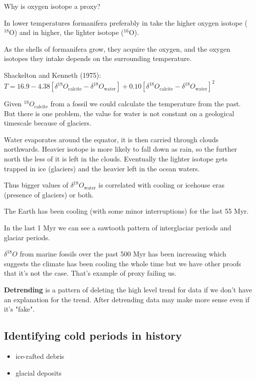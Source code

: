 Why is oxygen isotope a proxy?

In lower temperatures formanifera preferably in take the higher oxygen
isotope (${}^{18}$O) and in higher, the lighter isotope (${}^{16}$O).

As the shells of formanifera grow, they acquire the oxygen, and the oxygen
isotopes they intake depends on the surrounding temperature.

Shackelton and Kenneth (1975):
$T = 16.9 - 4.38[
\delta^{18}O_{\text{calcite}} - \delta^{18}O_{\text{water}}
]
+
0.10[
\delta^{18}O_{\text{calcite}} - \delta^{18}O_{\text{water}}
]^2
$

Given $^{18}O_{\text{calcite}}$ from a fossil we could calculate the
temperature from the past. But there is one problem, the value for water
is not constant on a geological timescale because of glaciers.

Water evaporates around the equator, it is then carried through clouds
northwards. Heavier isotope is more likely to fall down as rain, so the
further north the less of it is left in the clouds. Eventually the lighter
isotope gets trapped in ice (glaciers) and the heavier left in the ocean
waters.

Thus bigger values of $\delta^{18}O_{\text{water}}$ is correlated with
cooling or icehouse eras (presence of glaciers) or both.

The Earth has been cooling (with some minor interruptions) for the last 55 Myr.

In the last 1 Myr we can see a sawtooth pattern of interglaciar periods and
glaciar periods.

$\delta^{18}O$ from marine fossils over the past 500 Myr has been increasing
which suggests the climate has been cooling the whole time but we have other
proofs that it's not the case. That's example of proxy failing us.

\textbf{Detrending} is a pattern of deleting the high level trend for data
if we don't have an explanation for the trend. After detrending data may make
more sense even if it's "fake".

\subsection{Identifying cold periods in history}

\begin{itemize}
	\item ice-rafted debris
	\item glacial deposits
\end{itemize}

